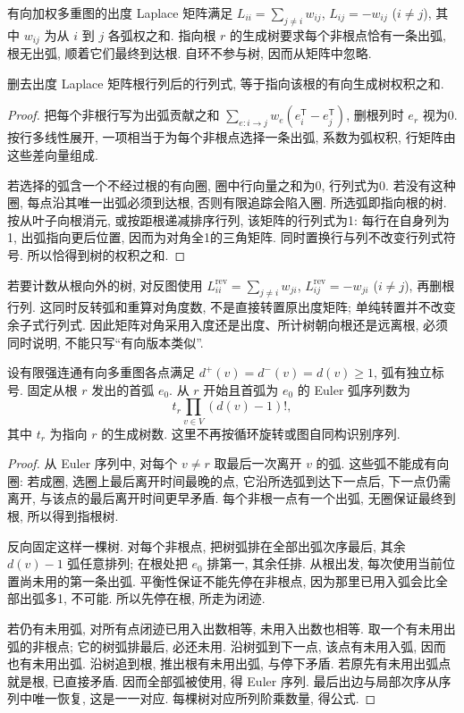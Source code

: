 \begin{definition}
有向加权多重图的出度 Laplace 矩阵满足 $L_{ii}=\sum_{j\ne i}w_{ij}$, $L_{ij}=-w_{ij}$ ($i\ne j$), 其中 $w_{ij}$ 为从 $i$ 到 $j$ 各弧权之和. 指向根 $r$ 的生成树要求每个非根点恰有一条出弧, 根无出弧, 顺着它们最终到达根. 自环不参与树, 因而从矩阵中忽略.
\end{definition}
\begin{theorem}\label{thm:directedmatrix-tree}
删去出度 Laplace 矩阵根行列后的行列式, 等于指向该根的有向生成树权积之和.
\end{theorem}
\begin{proof}
把每个非根行写为出弧贡献之和 $\sum_{e:i\to j}w_e(e_i^{\mathsf T}-e_j^{\mathsf T})$, 删根列时 $e_r$ 视为0. 按行多线性展开, 一项相当于为每个非根点选择一条出弧, 系数为弧权积, 行矩阵由这些差向量组成.

若选择的弧含一个不经过根的有向圈, 圈中行向量之和为0, 行列式为0. 若没有这种圈, 每点沿其唯一出弧必须到达根, 否则有限追踪会陷入圈. 所选弧即指向根的树. 按从叶子向根消元, 或按距根递减排序行列, 该矩阵的行列式为1: 每行在自身列为1, 出弧指向更后位置, 因而为对角全1的三角矩阵. 同时置换行与列不改变行列式符号. 所以恰得到树的权积之和.
\end{proof}
若要计数从根向外的树, 对反图使用 $L^{\mathrm{rev}}_{ii}=\sum_{j\ne i}w_{ji}$, $L^{\mathrm{rev}}_{ij}=-w_{ji}$ ($i\ne j$), 再删根行列. 这同时反转弧和重算对角度数, 不是直接转置原出度矩阵; 单纯转置并不改变余子式行列式. 因此矩阵对角采用入度还是出度、所计树朝向根还是远离根, 必须同时说明, 不能只写“有向版本类似”.
\begin{theorem}[BEST]\label{thm:best}
设有限强连通有向多重图各点满足 $d^+(v)=d^-(v)=d(v)\ge1$, 弧有独立标号. 固定从根 $r$ 发出的首弧 $e_0$. 从 $r$ 开始且首弧为 $e_0$ 的 Euler 弧序列数为
\[
t_r\prod_{v\in V}(d(v)-1)!,
\]
其中 $t_r$ 为指向 $r$ 的生成树数. 这里不再按循环旋转或图自同构识别序列.
\end{theorem}
\begin{proof}
从 Euler 序列中, 对每个 $v\ne r$ 取最后一次离开 $v$ 的弧. 这些弧不能成有向圈: 若成圈, 选圈上最后离开时间最晚的点, 它沿所选弧到达下一点后, 下一点仍需离开, 与该点的最后离开时间更早矛盾. 每个非根一点有一个出弧, 无圈保证最终到根, 所以得到指根树.

反向固定这样一棵树. 对每个非根点, 把树弧排在全部出弧次序最后, 其余 $d(v)-1$ 弧任意排列; 在根处把 $e_0$ 排第一, 其余任排. 从根出发, 每次使用当前位置尚未用的第一条出弧. 平衡性保证不能先停在非根点, 因为那里已用入弧会比全部出弧多1, 不可能. 所以先停在根, 所走为闭迹.

若仍有未用弧, 对所有点闭迹已用入出数相等, 未用入出数也相等. 取一个有未用出弧的非根点; 它的树弧排最后, 必还未用. 沿树弧到下一点, 该点有未用入弧, 因而也有未用出弧. 沿树追到根, 推出根有未用出弧, 与停下矛盾. 若原先有未用出弧点就是根, 已直接矛盾. 因而全部弧被使用, 得 Euler 序列. 最后出边与局部次序从序列中唯一恢复, 这是一一对应. 每棵树对应所列阶乘数量, 得公式.
\end{proof}
